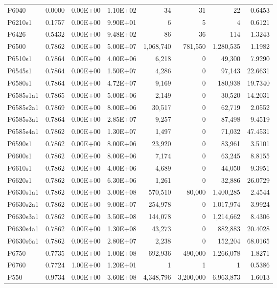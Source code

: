 \begin{longtable}{lrrrrrrr}
P6040 & 0.0000 & 0.00E+00 & 1.10E+02 & 34 & 31 & 22 & 0.6453 \\
P6210s1 & 0.1757 & 0.00E+00 & 9.90E+01 & 6 & 5 & 4 & 0.6121 \\
P6426 & 0.5432 & 0.00E+00 & 9.48E+02 & 86 & 36 & 114 & 1.3243 \\
P6500 & 0.7862 & 0.00E+00 & 5.00E+07 & 1,068,740 & 781,550 & 1,280,535 & 1.1982 \\
P6510s1 & 0.7864 & 0.00E+00 & 4.00E+06 & 6,218 & 0 & 49,300 & 7.9290 \\
P6545s1 & 0.7864 & 0.00E+00 & 1.50E+07 & 4,286 & 0 & 97,143 & 22.6631 \\
P6580s1 & 0.7864 & 0.00E+00 & 4.72E+07 & 9,169 & 0 & 180,938 & 19.7340 \\
P6585s1a1 & 0.7865 & 0.00E+00 & 5.00E+06 & 2,149 & 0 & 30,520 & 14.2031 \\
P6585s2a1 & 0.7869 & 0.00E+00 & 8.00E+06 & 30,517 & 0 & 62,719 & 2.0552 \\
P6585s3a1 & 0.7864 & 0.00E+00 & 2.85E+07 & 9,257 & 0 & 87,498 & 9.4519 \\
P6585s4a1 & 0.7862 & 0.00E+00 & 1.30E+07 & 1,497 & 0 & 71,032 & 47.4531 \\
P6590s1 & 0.7862 & 0.00E+00 & 8.00E+06 & 23,920 & 0 & 83,961 & 3.5101 \\
P6600s1 & 0.7862 & 0.00E+00 & 8.00E+06 & 7,174 & 0 & 63,245 & 8.8155 \\
P6610s1 & 0.7862 & 0.00E+00 & 4.00E+06 & 4,689 & 0 & 44,050 & 9.3951 \\
P6620s1 & 0.7862 & 0.00E+00 & 6.30E+06 & 1,261 & 0 & 32,886 & 26.0729 \\
P6630s1a1 & 0.7862 & 0.00E+00 & 3.00E+08 & 570,510 & 80,000 & 1,400,285 & 2.4544 \\
P6630s2a1 & 0.7862 & 0.00E+00 & 9.00E+07 & 254,978 & 0 & 1,017,974 & 3.9924 \\
P6630s3a1 & 0.7862 & 0.00E+00 & 3.50E+08 & 144,078 & 0 & 1,214,662 & 8.4306 \\
P6630s4a1 & 0.7862 & 0.00E+00 & 1.30E+08 & 43,273 & 0 & 882,883 & 20.4028 \\
P6630s6a1 & 0.7862 & 0.00E+00 & 2.80E+07 & 2,238 & 0 & 152,204 & 68.0165 \\
P6750 & 0.7735 & 0.00E+00 & 1.00E+08 & 692,936 & 490,000 & 1,266,078 & 1.8271 \\
P6760 & 0.7724 & 1.00E+00 & 1.20E+01 & 1 & 1 & 1 & 0.5386 \\
P550 & 0.9734 & 0.00E+00 & 3.60E+08 & 4,348,796 & 3,200,000 & 6,963,873 & 1.6013 \\

\end{longtable}
